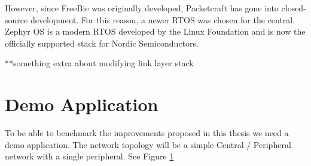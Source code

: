 However, since FreeBie was originally developed, Packetcraft has gone into closed-source development. For this reason, a newer RTOS was chosen for the central. Zephyr OS is a modern RTOS developed by the Linux Foundation and is now the officially supported stack for Nordic Semiconductors.

**something extra about modifying link layer stack

\section{Demo Application}
To be able to benchmark the improvements proposed in this thesis we need a demo application. The network topology will be a simple Central / Peripheral network with a single peripheral. See Figure \ref{}